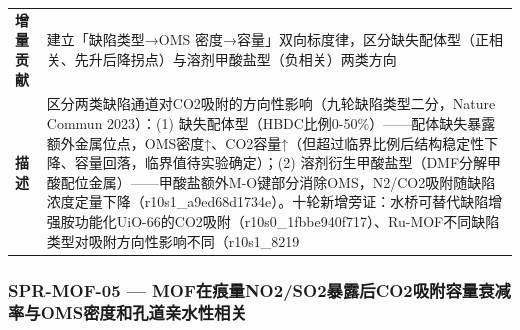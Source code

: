 \documentclass[12pt,a4paper]{ctexart}
\begin{document}
{\begin{longtable}[]{@{}
  >{\raggedright\arraybackslash}p{}
  >{\raggedright\arraybackslash}p{}@{}}
\textbf{增量贡献} & 建立「缺陷类型→OMS 密度→容量」双向标度律，区分缺失配体型（正相关、先升后降拐点）与溶剂甲酸盐型（负相关）两类方向 \\
\textbf{描述} & 区分两类缺陷通道对CO2吸附的方向性影响（九轮缺陷类型二分，Nature Commun 2023）：(1) 缺失配体型（HBDC比例0-50\%）------配体缺失暴露额外金属位点，OMS密度↑、CO2容量↑（但超过临界比例后结构稳定性下降、容量回落，临界值待实验确定）；(2) 溶剂衍生甲酸盐型（DMF分解甲酸配位金属）------甲酸盐额外M-O键部分消除OMS，N2/CO2吸附随缺陷浓度定量下降（r10s1\_a9ed68d1734e）。十轮新增旁证：水桥可替代缺陷增强胺功能化UiO-66的CO2吸附（r10s0\_1fbbe940f717）、Ru-MOF不同缺陷类型对吸附方向性影响不同（r10s1\_8219 \\
\end{longtable}
}

\subsubsection{SPR-MOF-05 --- MOF在痕量NO2/SO2暴露后CO2吸附容量衰减率与OMS密度和孔道亲水性相关}\label{spr-mof-05-mofux5728ux75d5ux91cfno2so2ux66b4ux9732ux540eco2ux5438ux9644ux5bb9ux91cfux8870ux51cfux7387ux4e0eomsux5bc6ux5ea6ux548cux5b54ux9053ux4eb2ux6c34ux6027ux76f8ux5173}
\end{document}
